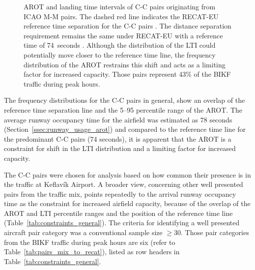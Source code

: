\begin{figure}[h]
    \caption[AROT and LTI of C-C pairs originating from ICAO M-M pairs]{AROT and landing time intervals of C-C pairs originating from ICAO M-M pairs. The dashed red line indicates the RECAT-EU reference time separation for the C-C pairs \protect{}. The distance separation requirement remains the same under RECAT-EU with a reference time of 74~seconds \protect{}. Although the distribution of the LTI could potentially move closer to the reference time line, the frequency distribution of the AROT restrains this shift and acts as a limiting factor for increased capacity. Those pairs represent 43\% of the BIKF traffic during peak hours.}
    \label{fig:CC_from_MM_pairs_time_sep}
\end{figure}

The frequency distributions for the C-C pairs in general, show an overlap of the reference time separation line and the 5--95 percentile range of the AROT. The average runway occupancy time for the airfield was estimated as 78 seconds (Section~\ref{ssec:runway_usage_arot}) and compared to the reference time line for the predominant C-C pairs (74 seconds), it is apparent that the AROT is a constraint for shift in the LTI distribution and a limiting factor for increased capacity.

The C-C pairs were chosen for analysis based on how common their presence is in the traffic at Keflavík Airport. A broader view, concerning other well presented pairs from the traffic mix, points repeatedly to the arrival runway occupancy time as the constraint for increased airfield capacity, because of the overlap of the AROT and LTI percentile ranges and the position of the reference time line (Table~\ref{tab:constraints_general}). The criteria for identifying a well presented aircraft pair category was a conventional sample size $\geq30$. Those pair categories from the BIKF traffic during peak hours are six (refer to Table~\ref{tab:pairs_mix_to_recat}), listed as row headers in Table~\ref{tab:constraints_general}. 

